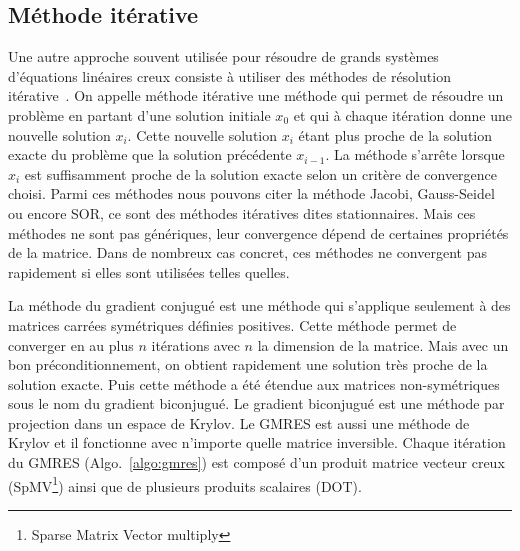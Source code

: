 \subsection{Méthode itérative}
Une autre approche souvent utilisée pour résoudre de grands systèmes d'équations linéaires creux consiste à utiliser des méthodes de résolution itérative~\cite{Saad96IMSLS}.
%
On appelle méthode itérative une méthode qui permet de résoudre un problème en partant d'une solution initiale $x_0$ et qui à chaque itération donne une nouvelle solution $x_i$.
%
Cette nouvelle solution $x_i$ étant plus proche de la solution exacte du problème que la solution précédente $x_{i-1}$.
%
La méthode s'arrête lorsque $x_i$ est suffisamment proche de la solution exacte selon un critère de convergence choisi.
%
Parmi ces méthodes nous pouvons citer la méthode Jacobi, Gauss-Seidel ou encore SOR, ce sont des méthodes itératives dites stationnaires.
%
Mais ces méthodes ne sont pas génériques, leur convergence dépend de certaines propriétés de la matrice.
%
Dans de nombreux cas concret, ces méthodes ne convergent pas rapidement si elles sont utilisées telles quelles.


La méthode du gradient conjugué est une méthode qui s'applique seulement à des matrices carrées symétriques définies positives.
%
Cette méthode permet de converger en au plus $n$ itérations avec $n$ la dimension de la matrice.
%
Mais avec un bon préconditionnement, on obtient rapidement une solution très proche de la solution exacte.
%
Puis cette méthode a été étendue aux matrices non-symétriques sous le nom du gradient biconjugué.
%
Le gradient biconjugué est une méthode par projection dans un espace de Krylov.
%
Le GMRES est aussi une méthode de Krylov et il fonctionne avec n'importe quelle matrice inversible.
%
Chaque itération du GMRES (Algo.~\ref{algo:gmres}) est composé d'un produit matrice vecteur creux (SpMV\footnote{Sparse Matrix Vector multiply}) ainsi que de plusieurs produits scalaires (DOT).

